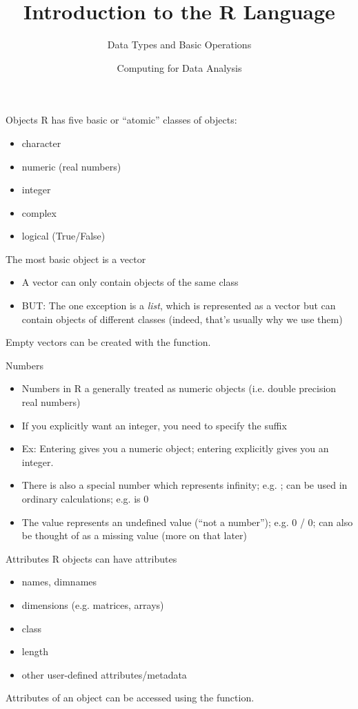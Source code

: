 \documentclass[aspectratio=169]{beamer}
\title[The R Language]{Introduction to the R Language}
\subtitle{Data Types and Basic Operations}
\date{Computing for Data Analysis}
\begin{document}
\begin{frame}
  \titlepage
\end{frame}


\begin{frame}{Objects}
R has five basic or ``atomic'' classes of objects:
\begin{itemize}
\item
character
\item
numeric (real numbers)
\item
integer
\item
complex
\item
logical  (True/False)
\end{itemize}
The most basic object is a vector
\begin{itemize}
\item
A vector can only contain objects of the same class
\item
BUT: The one exception is a \textit{list}, which is represented as a
vector but can contain objects of different classes (indeed, that's
usually why we use them)
\end{itemize}
Empty vectors can be created with the  function.
\end{frame}

\begin{frame}{Numbers}
\begin{itemize}
\item
Numbers in R a generally treated as numeric objects (i.e. double
precision real numbers)
\item
If you explicitly want an integer, you need to specify the 
suffix
\item
Ex: Entering  gives you a numeric object; entering 
explicitly gives you an integer. 
\item
There is also a special number  which represents infinity;
e.g.  ;  can be used in ordinary calculations;
e.g.  is 0
\item
The value  represents an undefined value (``not a number'');
e.g. 0 / 0;  can also be thought of as a missing value (more
on that later)
\end{itemize}
\end{frame}

\begin{frame}{Attributes}
R objects can have attributes
\begin{itemize}
\item
names, dimnames
\item
dimensions (e.g. matrices, arrays)
\item
class
\item
length
\item
other user-defined attributes/metadata
\end{itemize}
Attributes of an object can be accessed using the 
function.
\end{frame}
\end{document}
